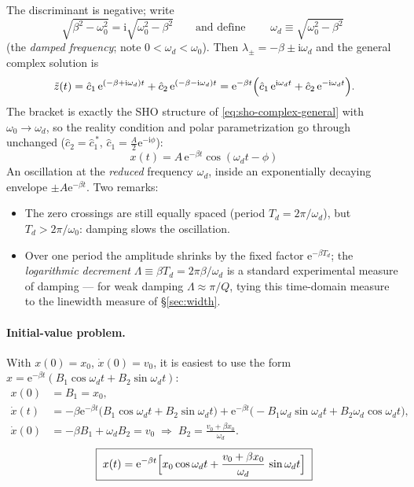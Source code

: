 \documentclass[11pt]{article}
\theoremstyle{plain}
\theoremstyle{definition}
\theoremstyle{remark}
\newcommand{\ee}{\mathrm{e}}
\newcommand{\ii}{\mathrm{i}}
\begin{document}
The discriminant is negative; write
\begin{equation}
  \sqrt{\beta^2 - \omega_0^2} = \ii\sqrt{\omega_0^2 - \beta^2}
  \qquad\text{and define}\qquad
  \boxed{\;\omega_d \equiv \sqrt{\omega_0^2 - \beta^2}\;}
\end{equation}
(the \emph{damped frequency}; note $0 < \omega_d < \omega_0$). Then
$\lambda_\pm = -\beta \pm \ii \omega_d$ and the general complex solution is
\begin{equation}
  \tilde z(t) = \hat c_1\,\ee^{(-\beta + \ii\omega_d)t} + \hat c_2\,\ee^{(-\beta-\ii\omega_d)t}
       = \ee^{-\beta t}\Bigl(\hat c_1\,\ee^{\ii\omega_d t} + \hat c_2\,\ee^{-\ii\omega_d t}\Bigr).
\end{equation}
The bracket is exactly the SHO structure of
\eqref{eq:sho-complex-general} with $\omega_0 \to \omega_d$, so the reality
condition and polar parametrization go through unchanged
($\hat c_2 = \hat c_1^{\,*}$, $\hat c_1 = \tfrac{A}{2}\ee^{-\ii\phi}$):
\begin{equation}
  \boxed{\;
  x(t) = A\,\ee^{-\beta t}\cos(\omega_d t - \phi)
  \;}
  \label{eq:underdamped-sol}
\end{equation}
An oscillation at the \emph{reduced} frequency $\omega_d$, inside an
exponentially decaying envelope $\pm A\ee^{-\beta t}$. Two remarks:
\begin{itemize}
  \item The zero crossings are still equally spaced (period
  $T_d = 2\pi/\omega_d$), but $T_d > 2\pi/\omega_0$: damping slows the
  oscillation.
  \item Over one period the amplitude shrinks by the fixed factor
  $\ee^{-\beta T_d}$; the \emph{logarithmic decrement}
  $\Lambda \equiv \beta T_d = 2\pi\beta/\omega_d$ is a standard experimental
  measure of damping --- for weak damping $\Lambda \approx \pi/Q$, tying
  this time-domain measure to the linewidth measure of \S\ref{sec:width}.
\end{itemize}

\paragraph{Initial-value problem.}
With $x(0)=x_0$, $\dot x(0)=v_0$, it is easiest to use the form
$x = \ee^{-\beta t}(B_1\cos\omega_d t + B_2\sin\omega_d t)$:
\begin{align}
  x(0) &= B_1 = x_0, \\
  \dot x(t) &= -\beta \ee^{-\beta t}\bigl(B_1\cos\omega_d t + B_2\sin\omega_d t\bigr)
   + \ee^{-\beta t}\bigl(-B_1\omega_d \sin\omega_d t + B_2\omega_d \cos\omega_d t\bigr), \nonumber\\
  \dot x(0) &= -\beta B_1 + \omega_d B_2 = v_0
  \;\Longrightarrow\;
  B_2 = \frac{v_0 + \beta x_0}{\omega_d}.
\end{align}
\begin{equation}
  \boxed{\;
  x(t) = \ee^{-\beta t}\Bigl[x_0 \cos\omega_d t
    + \frac{v_0+\beta x_0}{\omega_d}\,\sin\omega_d t\Bigr]
  \;}
  \label{eq:underdamped-ivp}
\end{equation}
\end{document}
